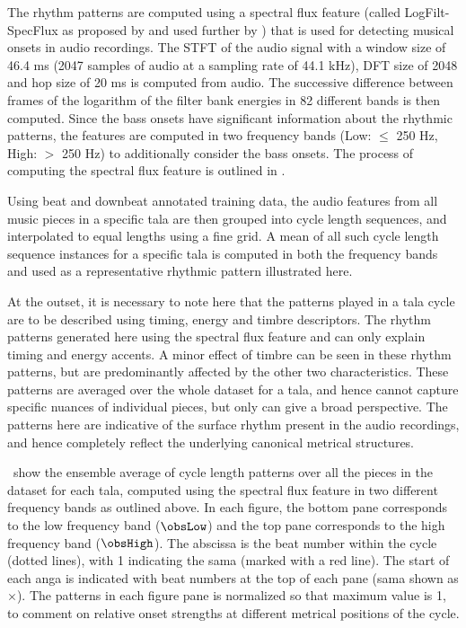 The rhythm patterns are computed using a spectral flux feature (called LogFilt- SpecFlux as proposed by  and used further by ) that is used for detecting musical onsets in audio recordings. The \gls{STFT} of the audio signal with a window size of 46.4 ms (2047 samples of audio at a sampling rate of 44.1 kHz), DFT size of 2048 and hop size of 20 ms is computed from audio. The successive difference between frames of the logarithm of the filter bank energies in 82 different bands is then computed. Since the bass onsets have significant information about the rhythmic patterns, the features are computed in two frequency bands (Low: $\leq$ 250 Hz, High: $>$ 250 Hz) to additionally consider the bass onsets. The process of computing the spectral flux feature is outlined in . 

Using beat and downbeat annotated training data, the audio features from all music pieces in a specific \gls{tala} are then grouped into cycle length sequences, and interpolated to equal lengths using a fine grid. A mean of all such cycle length sequence instances for a specific \gls{tala} is computed in both the frequency bands and used as a representative rhythmic pattern illustrated here. 

At the outset, it is necessary to note here that the patterns played in a \gls{tala} cycle are to be described using timing, energy and timbre descriptors. The rhythm patterns generated here using the spectral flux feature and can only explain timing and energy accents. A minor effect of timbre can be seen in these rhythm patterns, but are predominantly affected by the other two characteristics. These patterns are averaged over the whole dataset for a \gls{tala}, and hence cannot capture specific nuances of individual pieces, but only can give a broad perspective. The patterns here are indicative of the surface rhythm present in the audio recordings, and hence completely reflect the underlying canonical metrical structures. %

\ show the ensemble average of cycle length patterns over all the pieces in the dataset for each \gls{tala}, computed using the spectral flux feature in two different frequency bands as outlined above. In each figure, the bottom pane corresponds to the low frequency band ($\protect\obsLow$) and the top pane corresponds to the high frequency band ($\protect\obsHigh$). The abscissa is the beat number within the cycle (dotted lines), with 1 indicating the \gls{sama} (marked with a red line). The start of each \gls{anga} is indicated with beat numbers at the top of each pane (\gls{sama} shown as $\times$). The patterns in each figure pane is normalized so that maximum value is 1, to comment on relative onset strengths at different metrical positions of the cycle. 

